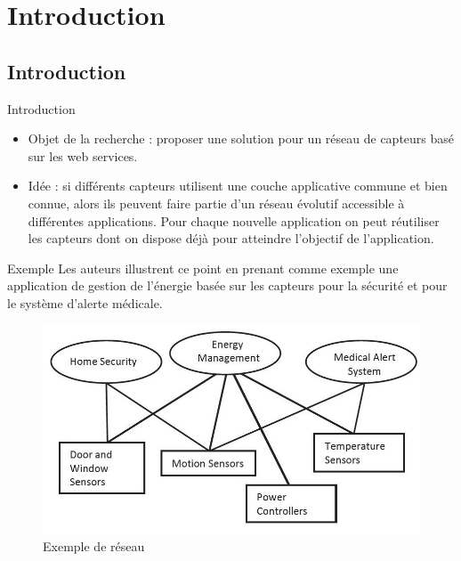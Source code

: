 
\section{Introduction}
\subsection{Introduction}
\begin{frame}{Introduction}
\begin{itemize}
\item Objet de la recherche : proposer une solution pour un réseau de capteurs basé sur les web services. 

\item Idée : si différents capteurs utilisent une couche applicative commune et bien connue, alors ils peuvent faire partie d'un réseau évolutif accessible à différentes applications. Pour chaque nouvelle application on peut réutiliser les capteurs dont on dispose déjà pour atteindre l'objectif de l'application.
\end{itemize}
\end{frame}

\begin{frame}{Exemple}
Les auteurs illustrent ce point en prenant comme exemple une application de gestion de l'énergie basée sur les capteurs pour la sécurité et pour le système d'alerte médicale. 
\begin{figure}
  \centering
  \includegraphics[scale=0.4]{figures/exemple.jpg}
  \caption{Exemple de réseau}
 \end{figure} 
\end{frame}


